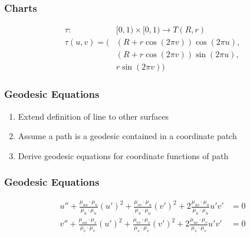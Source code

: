 \documentclass{beamer}
\begin{document}
\begin{frame}
	
	\frametitle{Charts}
	
	\begin{align*}
	\tau:&[0,1)\times[0,1) \to T(R,r) \\
	\tau(u,v) = \Big(&(R+r\cos(2\pi v))\cos(2\pi u), \\
	&(R+r\cos(2\pi v))\sin(2\pi u), \\
	&r\sin(2\pi v) \Big)
	\end{align*}
	
\end{frame}


\begin{frame}
	
	\frametitle{Geodesic Equations}
	
	\begin{enumerate}
		\item Extend definition of line to other surfaces
		\item Assume a path is a geodesic contained in a coordinate patch
		\item Derive geodesic equations for coordinate functions of path
	\end{enumerate}

\end{frame}


\begin{frame}
	
	\frametitle{Geodesic Equations}
	
	\begin{align*}
		u'' + \frac{\mu_{uu} \cdot \mu_u}{\mu_u \cdot \mu_u} (u')^2 + \frac{\mu_{vv} \cdot \mu_u}{\mu_u \cdot \mu_u} (v')^2 + 2\frac{\mu_{uv} \cdot \mu_u}{\mu_u \cdot \mu_u} u'v' & = 0 \\
		v'' + \frac{\mu_{uu} \cdot \mu_v}{\mu_v \cdot \mu_v} (u')^2 + \frac{\mu_{vv} \cdot \mu_v}{\mu_v \cdot \mu_v} (v')^2 + 2\frac{\mu_{uv} \cdot \mu_v}{\mu_v \cdot \mu_v} u'v' & = 0 \\
	\end{align*}
	
	
\end{frame}

\end{document}
